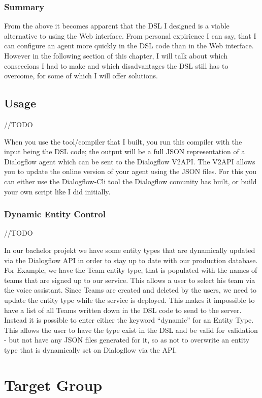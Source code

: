 \subsubsection{Summary}
From the above it becomes apparent that the DSL I designed is a viable alternative to using the Web interface.
From personal expirience I can say, that I can configure an agent more quickly in the DSL code than in the Web interface. However in the following section of this chapter, I will talk about which conseccions I had to make and which disadvantages the DSL still has to overcome, for some of which I will offer solutions.

\subsection{Usage}
//TODO

When you use the tool/compiler that I built, you run this compiler with the input being the DSL code; the output will be a full JSON representation of a Dialogflow agent which can be sent to the Dialogflow V2API.
The V2API allows you to update the online version of your agent using the JSON files. For this you can either use the Dialogflow-Cli tool the Dialogflow comunity has built, or build your own script like I did initially.\cite{0xcaff2018}

\subsubsection{Dynamic Entity Control}
//TODO

In our bachelor projekt we have some entity types that are dynamically updated via the Dialogflow API in order to stay up to date with our production database. For Example, we have the Team entity type, that is populated with the names of teams that are signed up to our service. This allows a user to select his team via the voice assistant.
Since Teams are created and deleted by the users, we need to update the entity type while the service is deployed.
This makes it impossible to have a list of all Teams written down in the DSL code to send to the server. 
Instead it is possible to enter either the keyword “dynamic” for an Entity Type.
This allows the user to have the type exist in the DSL and be valid for validation - but not have any JSON files generated for it, so as not to overwrite an entity type that is dynamically set on Dialogflow via the API.

\section{Target Group}

